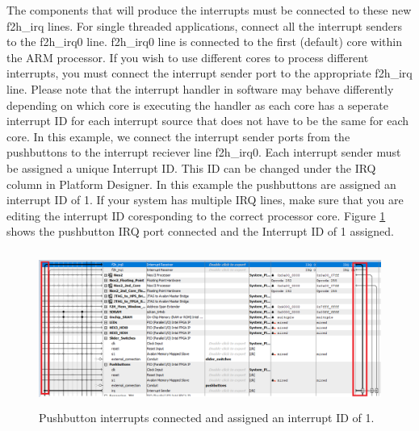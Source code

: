 \documentclass[11pt, twoside, pdftex]{article}
\begin{document}
The components that will produce the interrupts must be connected to these new f2h{\_}irq lines. For single threaded applications, connect all the interrupt senders to the f2h{\_}irq0 line. f2h{\_}irq0 line is connected to the first (default) core within the ARM processor. If you wish to use different cores to process different interrupts, you must connect the interrupt sender port to the appropriate f2h{\_}irq line. Please note that the interrupt handler in software may behave differently depending on which core is executing the handler as each core has a seperate interrupt ID for each interrupt source that does not have to be the same for each core. In this example, we connect the interrupt sender ports from the pushbuttons to the interrupt reciever line f2h{\_}irq0. Each interrupt sender must be assigned a unique Interrupt ID. This ID can be changed under the IRQ column in Platform Designer. In this example the pushbuttons are assigned an interrupt ID of 1. If your system has multiple IRQ lines, make sure that you are editing the interrupt ID coresponding to the correct processor core. Figure \ref{fig:fig_PFsys_int} shows the pushbutton IRQ port connected and the Interrupt ID of 1 assigned.

\begin{figure}[h!]
   \begin{center}
       \includegraphics[width=6in, height=2in]{figures/intID}
   \end{center}
   \caption{Pushbutton interrupts connected and assigned an interrupt ID of 1.}
	\label{fig:fig_PFsys_int}
\end{figure}
\end{document}
